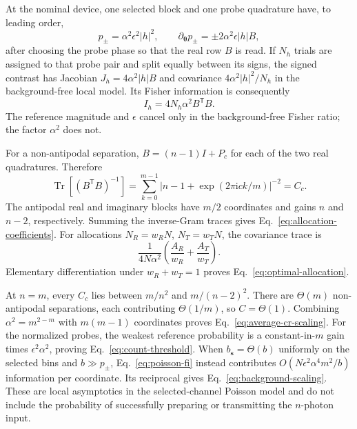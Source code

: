 \documentclass[aps,pra,reprint,amsmath,amssymb,superscriptaddress,longbibliography]{revtex4-2}
\newcommand{\ii}{\mathrm{i}}
\newcommand{\Tr}{\operatorname{Tr}}
\newcommand{\btheta}{\bm{\theta}}
\begin{document}
At the nominal device, one selected block and one probe quadrature have,
to leading order,
\begin{equation}
 p_\pm=\alpha^2\epsilon^2|h|^2,\qquad
 \partial_{\btheta}p_\pm
 =\pm2\alpha^2\epsilon |h|B ,
\end{equation}
after choosing the probe phase so that the real row $B$ is read.  If
$N_h$ trials are assigned to that probe pair and split equally between its
signs, the signed contrast has Jacobian
$J_h=4\alpha^2|h|B$ and covariance
$4\alpha^2|h|^2/N_h$ in the background-free local model.  Its Fisher
information is consequently
\begin{equation}
 I_h=4N_h\alpha^2B^{\mathsf T}B .
\label{eq:block-information}
\end{equation}
The reference magnitude and $\epsilon$ cancel only in the
background-free Fisher ratio; the factor $\alpha^2$ does not.

For a non-antipodal separation, $B=(n-1)I+P_c$ for each of the two real
quadratures.  Therefore
\begin{equation}
 \Tr[(B^{\mathsf T}B)^{-1}]
 =\sum_{k=0}^{m-1}
 |n-1+\exp(2\pi\ii ck/m)|^{-2}=C_c.
\end{equation}
The antipodal real and imaginary blocks have $m/2$ coordinates and gains
$n$ and $n-2$, respectively.  Summing the inverse-Gram traces gives
Eq.~\eqref{eq:allocation-coefficients}.  For allocations
$N_R=w_RN$, $N_T=w_TN$, the covariance trace is
\begin{equation}
 \frac{1}{4N\alpha^2}
 \left(\frac{A_R}{w_R}+\frac{A_T}{w_T}\right).
\end{equation}
Elementary differentiation under $w_R+w_T=1$ proves
Eq.~\eqref{eq:optimal-allocation}.

At $n=m$, every $C_c$ lies between $m/n^2$ and
$m/(n-2)^2$.  There are $\Theta(m)$ non-antipodal separations, each
contributing $\Theta(1/m)$, so $C=\Theta(1)$.  Combining
$\alpha^2=m^{2-m}$ with $m(m-1)$ coordinates proves
Eq.~\eqref{eq:average-cr-scaling}.  For the normalized probes, the weakest
reference probability is a constant-in-$m$ gain times
$\epsilon^2\alpha^2$, proving Eq.~\eqref{eq:count-threshold}.  When
$b_{\bm s}=\Theta(b)$ uniformly on the selected bins and
$b\gg p_\pm$, Eq.~\eqref{eq:poisson-fi} instead contributes
$O(N\epsilon^2\alpha^4m^2/b)$ information per coordinate.  Its reciprocal
gives Eq.~\eqref{eq:background-scaling}.  These are local asymptotics in
the selected-channel Poisson model and do not include the probability of
successfully preparing or transmitting the $n$-photon input.
\end{document}
